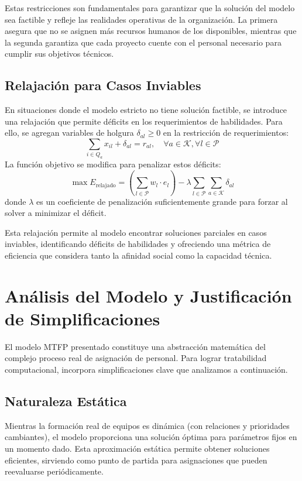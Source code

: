 \documentclass[conference]{IEEEtran}
\begin{document}
Estas restricciones son fundamentales para garantizar que la solución del modelo sea factible y refleje las realidades operativas de la organización. La primera asegura que no se asignen más recursos humanos de los disponibles, mientras que la segunda garantiza que cada proyecto cuente con el personal necesario para cumplir sus objetivos técnicos.

\subsection{Relajación para Casos Inviables}
\label{sec:relaxation_infeasible}

En situaciones donde el modelo estricto no tiene solución factible, se introduce una relajación que permite déficits en los requerimientos de habilidades. Para ello, se agregan variables de holgura \(\delta_{al} \geq 0\) en la restricción de requerimientos:
\begin{equation}
    \sum_{i \in Q_a} x_{il} + \delta_{al} = r_{al}, \quad \forall a \in \mathcal{K}, \forall l \in \mathcal{P}
    \label{eq:constraint_skills_relaxed}
\end{equation}
La función objetivo se modifica para penalizar estos déficits:
\begin{equation}
    \max E_{\text{relajado}} = \left( \sum_{l \in \mathcal{P}} w_l \cdot e_l \right) - \lambda \sum_{l \in \mathcal{P}} \sum_{a \in \mathcal{K}} \delta_{al}
    \label{eq:objective_total_relaxed}
\end{equation}
donde \(\lambda\) es un coeficiente de penalización suficientemente grande para forzar al solver a minimizar el déficit.

Esta relajación permite al modelo encontrar soluciones parciales en casos inviables, identificando déficits de habilidades y ofreciendo una métrica de eficiencia que considera tanto la afinidad social como la capacidad técnica.

\section{Análisis del Modelo y Justificación de Simplificaciones}

El modelo MTFP presentado constituye una abstracción matemática del complejo proceso real de asignación de personal. Para lograr tratabilidad computacional, incorpora simplificaciones clave que analizamos a continuación.

\subsection{Naturaleza Estática}
Mientras la formación real de equipos es dinámica (con relaciones y prioridades cambiantes), el modelo proporciona una solución óptima para parámetros fijos en un momento dado. Esta aproximación estática permite obtener soluciones eficientes, sirviendo como punto de partida para asignaciones que pueden reevaluarse periódicamente.
\end{document}

